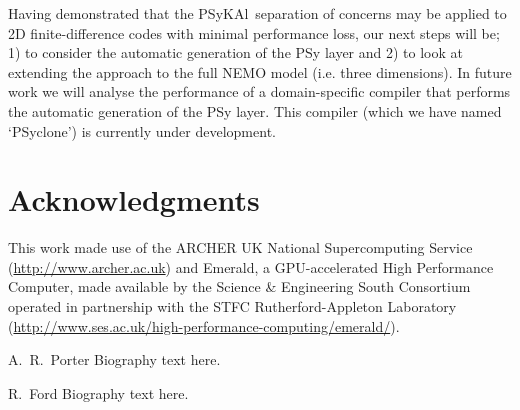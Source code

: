 \documentclass[journal]{IEEEtran}
\newcommand{\psykal}{{PS}y{KA}l}
\begin{document}
Having demonstrated that the \psykal\ separation of concerns may be
applied to 2D finite-difference codes with minimal performance loss,
our next steps will be; 1) to consider the automatic generation of the
PSy layer and 2) to look at extending the approach to the full NEMO
model (i.e. three dimensions). In future work we will analyse the
performance of a domain-specific compiler that performs the automatic
generation of the PSy layer. This compiler (which we have named
`PSyclone') is currently under development.


\section*{Acknowledgments}

This work made use of the ARCHER UK National Supercomputing Service
(\url{http://www.archer.ac.uk}) and Emerald, a GPU-accelerated High
Performance Computer, made available by the Science \& Engineering
South Consortium operated in partnership with the STFC
Rutherford-Appleton Laboratory
(\url{http://www.ses.ac.uk/high-performance-computing/emerald/}).



%

% 

\begin{IEEEbiographynophoto}{A.~R.~Porter}
Biography text here.
\end{IEEEbiographynophoto}

\begin{IEEEbiographynophoto}{R.~Ford}
Biography text here.
\end{IEEEbiographynophoto}
\end{document}

